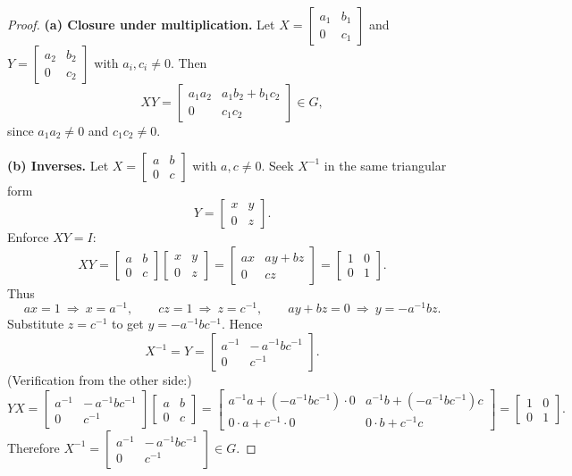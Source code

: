 \documentclass[12pt]{article}
\theoremstyle{definition}
\begin{document}
\begin{proof}
\textbf{(a) Closure under multiplication.}
Let $X=\begin{bmatrix}a_1&b_1\\ 0&c_1\end{bmatrix}$ and $Y=\begin{bmatrix}a_2&b_2\\ 0&c_2\end{bmatrix}$ with $a_i,c_i\neq0$. Then
\[
XY=\begin{bmatrix}
a_1a_2 & a_1b_2+b_1c_2\\
0 & c_1c_2
\end{bmatrix}\in G,
\]
since $a_1a_2\neq0$ and $c_1c_2\neq0$.

\smallskip
\textbf{(b) Inverses.}
Let $X=\begin{bmatrix}a&b\\ 0&c\end{bmatrix}$ with $a,c\neq 0$. 
Seek $X^{-1}$ in the same triangular form 
\[
Y=\begin{bmatrix}x&y\\ 0&z\end{bmatrix}.
\]
Enforce $XY=I$:
\[
XY=\begin{bmatrix}a&b\\ 0&c\end{bmatrix}
\begin{bmatrix}x&y\\ 0&z\end{bmatrix}
=
\begin{bmatrix}
ax & ay+bz\\
0 & cz
\end{bmatrix}
=
\begin{bmatrix}1&0\\ 0&1\end{bmatrix}.
\]
Thus
\[
ax=1\ \Rightarrow\ x=a^{-1},\qquad cz=1\ \Rightarrow\ z=c^{-1},\qquad
ay+bz=0\ \Rightarrow\ y=-a^{-1}bz.
\]
Substitute $z=c^{-1}$ to get $y=-a^{-1}bc^{-1}$. Hence
\[
X^{-1}=Y=\begin{bmatrix}
a^{-1} & -\,a^{-1}bc^{-1}\\[2pt]
0 & c^{-1}
\end{bmatrix}.
\]
(Verification from the other side:)
\[
YX=
\begin{bmatrix}
a^{-1} & -\,a^{-1}bc^{-1}\\
0 & c^{-1}
\end{bmatrix}
\begin{bmatrix}a&b\\ 0&c\end{bmatrix}
=
\begin{bmatrix}
a^{-1}a+(-a^{-1}bc^{-1})\cdot 0 & a^{-1}b+(-a^{-1}bc^{-1})c\\
0\cdot a+c^{-1}\cdot 0 & 0\cdot b+c^{-1}c
\end{bmatrix}
=
\begin{bmatrix}1&0\\ 0&1\end{bmatrix}.
\]
Therefore $X^{-1}=\begin{bmatrix}a^{-1} & -\,a^{-1}bc^{-1}\\ 0 & c^{-1}\end{bmatrix}\in G$.


\end{proof}
\end{document}
